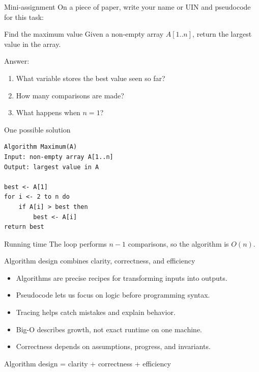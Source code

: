 \documentclass[11pt,aspectratio=43]{beamer}
\begin{document}
\begin{frame}{Mini-assignment}
On a piece of paper, write your name or UIN and pseudocode for this task:
\begin{block}{Find the maximum value}
  Given a non-empty array $A[1..n]$, return the largest value in the array.
\end{block}

\vspace{0.5em}
Answer:
\begin{enumerate}
  \item What variable stores the best value seen so far?
  \item How many comparisons are made?
  \item What happens when $n=1$?
\end{enumerate}
\end{frame}

\begin{frame}[fragile]{One possible solution}
\begin{lstlisting}[style=pseudo]
Algorithm Maximum(A)
Input: non-empty array A[1..n]
Output: largest value in A

best <- A[1]
for i <- 2 to n do
    if A[i] > best then
        best <- A[i]
return best
\end{lstlisting}

\begin{block}{Running time}
  The loop performs $n-1$ comparisons, so the algorithm is $O(n)$.
\end{block}
\end{frame}

\begin{frame}{Algorithm design combines clarity, correctness, and efficiency}
\begin{itemize}
  \item Algorithms are precise recipes for transforming inputs into outputs.
  \item Pseudocode lets us focus on logic before programming syntax.
  \item Tracing helps catch mistakes and explain behavior.
  \item Big-O describes growth, not exact runtime on one machine.
  \item Correctness depends on assumptions, progress, and invariants.
\end{itemize}

\vspace{0.8em}
\begin{center}
  \large Algorithm design = clarity + correctness + efficiency
\end{center}
\end{frame}
\end{document}
